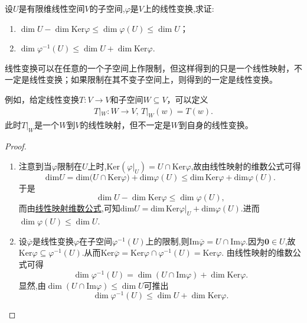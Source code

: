 \documentclass[../../main.tex]{subfiles}%
\begin{document}
\begin{proposition}\label{proposition:线性变换关于子空间的维数不等式}
设\(U\)是有限维线性空间\(V\)的子空间,\(\varphi\)是\(V\)上的线性变换,求证:
\begin{enumerate}[(1)]
\item \(\dim U-\dim\text{Ker}\varphi\leqslant \dim\varphi(U)\leqslant \dim U\)；

\item \(\dim\varphi^{-1}(U)\leqslant \dim U+\dim\text{Ker}\varphi\).
\end{enumerate}
\end{proposition}
\begin{note}
线性变换可以在任意的一个子空间上作限制，但这样得到的只是一个线性映射，不一定是线性变换；如果限制在其不变子空间上，则得到的一定是线性变换。

例如，给定线性变换$T:V\rightarrow V$和子空间$W\subseteq V$，可以定义
\begin{align*}
T|_W:W\rightarrow V,\,T|_W\left( w \right) =T\left( w \right).
\end{align*}
此时$T|_W$是一个$W$到$V$的线性映射，但不一定是$W$到自身的线性变换。
\end{note}
\begin{proof}
\begin{enumerate}[(1)]
\item 注意到当\(\varphi\)限制在\(U\)上时,\(\text{Ker}(\varphi|_U)=U\cap\text{Ker}\varphi\),故由线性映射的维数公式可得
\[
\mathrm{dim}U=\mathrm{dim(}U\cap \mathrm{Ker}\varphi )+\mathrm{dim}\varphi (U)\leqslant \mathrm{dim}\,\mathrm{Ker}\varphi +\mathrm{dim}\varphi (U).
\]
于是
\[
\dim U - \dim\text{Ker}\varphi\leqslant \dim\varphi(U),
\]
而由\hyperref[theorem:值域和核空间维数之和等于原像空间维数]{线性映射维数公式},可知$\mathrm{dim}U=\mathrm{dim}\,\mathrm{Ker}\varphi |_U+\mathrm{dim}\varphi (U)$.进而\(\dim\varphi(U)\leqslant \dim U\).

\item 设\(\overline{\varphi}\)是线性变换\(\varphi\)在子空间\(\varphi^{-1}(U)\)上的限制,则\(\text{Im}\overline{\varphi}=U\cap\text{Im}\varphi\).因为\(\boldsymbol{0}\in U\),故\(\text{Ker}\varphi\subseteq\varphi^{-1}(U)\).从而\(\text{Ker}\overline{\varphi}=\text{Ker}\varphi\cap\varphi^{-1}(U)=\text{Ker}\varphi\). 由线性映射的维数公式可得
\[
\dim\varphi^{-1}(U)=\dim(U\cap\text{Im}\varphi)+\dim\text{Ker}\varphi.
\]
显然,由\(\dim(U\cap\text{Im}\varphi)\leqslant \dim U\)可推出
\[
\dim\varphi^{-1}(U)\leqslant \dim U+\dim\text{Ker}\varphi. 
\]
\end{enumerate}

\end{proof}
\end{document}
